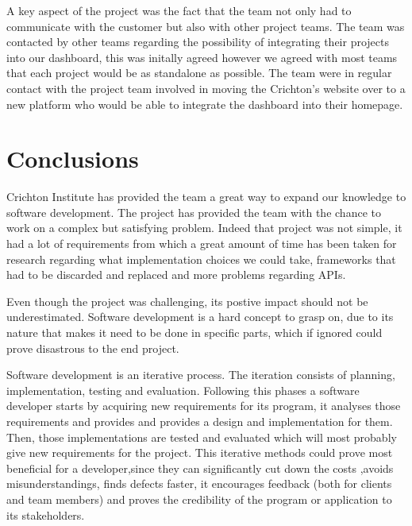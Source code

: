 \documentclass{l3proj}
\begin{document}
A key aspect of the project was the fact that the team not only had to communicate with the customer but also with
other project teams. The team was contacted by other teams regarding the possibility of integrating their projects into
our dashboard, this was initally agreed however we agreed with most teams that each project would be as standalone as
possible. The team were in regular contact with the project team involved in moving the Crichton's website over to a
new platform who would be able to integrate the dashboard into their homepage.


\section{Conclusions}
\label{sec:conclusions}


Crichton Institute has provided the team a great way to expand our knowledge to software development. The project has
provided the team with the chance to work on a complex but satisfying problem. Indeed that project was not simple,
it had a lot of requirements from which a great amount of time has been taken for research regarding what implementation
choices we could take, frameworks that had to be discarded and replaced and more problems regarding APIs.

Even though the project was challenging, its postive impact should not be underestimated. Software development is a hard
concept to grasp on, due to its  nature that makes it need to be done in specific parts, which if ignored could prove
disastrous to the end project.

Software development is an iterative process. The iteration consists of planning, implementation, testing and evaluation.
Following this phases a software developer  starts by acquiring new requirements for its program, it analyses those
requirements and provides and provides a design and implementation for them. Then, those implementations are tested and
evaluated which will most probably give new requirements for the project. This iterative methods could prove most
beneficial for a developer,since they can significantly cut down the costs ,avoids misunderstandings, finds defects
faster, it encourages feedback (both for clients and team members) and proves the credibility of the program or
application to its stakeholders.
\end{document}
